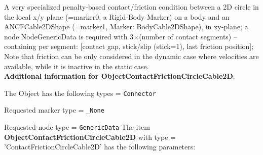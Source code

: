 %
\newpage

\label{sec:item:ObjectContactFrictionCircleCable2D}
A very specialized penalty-based contact/friction condition between a 2D circle in the local x/y plane (=marker0, a Rigid-Body Marker) on a body and an ANCFCable2DShape (=marker1, Marker: BodyCable2DShape), in xy-plane; a node NodeGenericData is required with 3$\times$(number of contact segments) -- containing per segment: [contact gap, stick/slip (stick=1), last friction position]; Note that friction can be only considered in the dynamic case where velocities are available, while it is inactive in the static case.\vspace{12pt}
 \\{\bf Additional information for ObjectContactFrictionCircleCable2D}:
\bi
  \item The Object has the following types = \texttt{Connector}
  \item Requested marker type = \texttt{\_None}
  \item Requested node type = \texttt{GenericData}
\ei
\vspace{12pt} \noindent The item {\bf ObjectContactFrictionCircleCable2D} with type = 'ContactFrictionCircleCable2D' has the following parameters:\vspace{-1cm}\\ 
